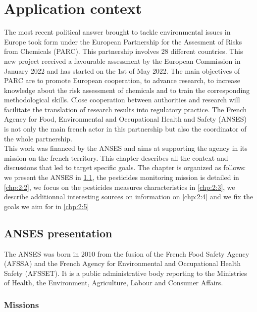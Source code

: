 \chapter{Application context}\label{chp:2}

\minitoc

\clearpage

The most recent political answer brought to tackle environmental issues in Europe took form under the European Partnership for the Assesment of Risks from Chemicals (PARC). This partnership involves 28 different countries. This new project received a favourable assessment by the European Commission in January 2022 and has started on the 1st of May 2022. The main objectives of PARC are to promote European cooperation, to advance research, to increase knowledge about the risk assessment of chemicals and to train the corresponding methodological skills. Close cooperation between authorities and research will facilitate the translation of research results into regulatory practice. The French Agency for Food, Environmental and Occupational Health and Safety (ANSES) is not only the main french actor in this partnership but also the coordinator of the whole partnership. \\
This work was financed by the ANSES and aims at supporting the agency in its mission on the french territory. This chapter describes all the context and discussions that led to target specific goals. The chapter is organized as follows: we present the ANSES in \ref{chp:2:1}, the pesticides monitoring mission is detailed in \ref{chp:2:2}, we focus on the pesticides measures characteristics in \ref{chp:2:3}, we describe additionnal interesting sources on information on \ref{chp:2:4} and we fix the goals we aim for in \ref{chp:2:5}     

\section{ANSES presentation}\label{chp:2:1}

The ANSES was born  in 2010 from the fusion of the French Food Safety Agency (AFSSA) and the French Agency for Environmental and Occupational Health Safety (AFSSET). It is a public administrative body reporting to the Ministries of Health, the Environment, Agriculture, Labour and Consumer Affairs.  

\subsection{Missions} 

